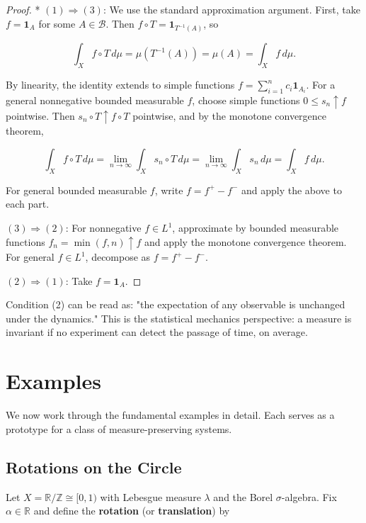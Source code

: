 \begin{proof}
* $(1) \Rightarrow (3)$: We use the standard approximation argument. First, take $f = \mathbf{1}_A$ for some $A \in \mathcal{B}$. Then $f \circ T = \mathbf{1}_{T^{-1}(A)}$, so

\[
\int_X f \circ T \, d\mu = \mu(T^{-1}(A)) = \mu(A) = \int_X f \, d\mu.
\]

By linearity, the identity extends to simple functions $f = \sum_{i=1}^n c_i \mathbf{1}_{A_i}$. For a general nonnegative bounded measurable $f$, choose simple functions $0 \le s_n \uparrow f$ pointwise. Then $s_n \circ T \uparrow f \circ T$ pointwise, and by the monotone convergence theorem,

\[
\int_X f \circ T \, d\mu = \lim_{n \to \infty} \int_X s_n \circ T \, d\mu = \lim_{n \to \infty} \int_X s_n \, d\mu = \int_X f \, d\mu.
\]

For general bounded measurable $f$, write $f = f^+ - f^-$ and apply the above to each part.

$(3) \Rightarrow (2)$: For nonnegative $f \in L^1$, approximate by bounded measurable functions $f_n = \min(f, n) \uparrow f$ and apply the monotone convergence theorem. For general $f \in L^1$, decompose as $f = f^+ - f^-$.

$(2) \Rightarrow (1)$: Take $f = \mathbf{1}_A$.
\end{proof}


\begin{remark}
Condition (2) can be read as: "the expectation of any observable is unchanged under the dynamics." This is the statistical mechanics perspective: a measure is invariant if no experiment can detect the passage of time, on average.


\bigskip

\end{remark}


\section{Examples}\label{sec:8.2}

We now work through the fundamental examples in detail. Each serves as a prototype for a class of measure-preserving systems.

\subsection{Rotations on the Circle}\label{sec:8.2.1}

Let $X = \mathbb{R}/\mathbb{Z} \cong [0,1)$ with Lebesgue measure $\lambda$ and the Borel $\sigma$-algebra. Fix $\alpha \in \mathbb{R}$ and define the \textbf{rotation} (or \textbf{translation}) by

